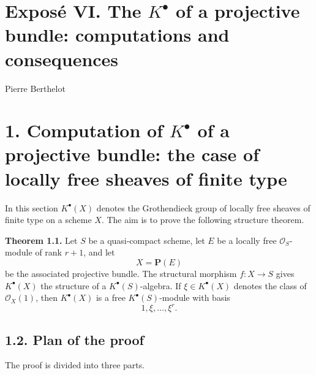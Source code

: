 \documentclass[11pt]{article}
\newcommand{\Spec}{\operatorname{Spec}}
\begin{document}
\providecommand{\Sym}{\operatorname{Sym}}
\providecommand{\Proj}{\operatorname{Proj}}
\providecommand{\Projz}{\operatorname{Proj}_0}
\providecommand{\Spec}{\operatorname{Spec}}
\providecommand{\Comp}{\operatorname{Comp}}
\providecommand{\Dplus}{D_{+}}
\providecommand{\id}{\operatorname{id}}
\providecommand{\cG}{\mathcal G}
\providecommand{\cA}{\mathcal A}
\providecommand{\cB}{\mathcal B}
\providecommand{\cL}{\mathscr L}
\providecommand{\cM}{\mathscr M}
\providecommand{\cN}{\mathscr N}
\providecommand{\cE}{\mathscr E}
\providecommand{\cK}{\mathscr K}
\providecommand{\cP}{\mathscr P}
\providecommand{\cQ}{\mathscr Q}
\providecommand{\OO}{\mathcal O}
\providecommand{\rk}{\operatorname{rk}}
\providecommand{\colim}{\operatorname*{colim}}


\section*{Exposé VI. The \(K^\bullet\) of a projective bundle: computations and consequences}
\begin{center}
Pierre Berthelot
\end{center}

\section*{1. Computation of \(K^\bullet\) of a projective bundle: the case of locally free sheaves of finite type}

In this section \(K^\bullet(X)\) denotes the Grothendieck group of locally free sheaves of finite type on a scheme \(X\). The aim is to prove the following structure theorem.

\textbf{Theorem 1.1.} Let \(S\) be a quasi-compact scheme, let \(E\) be a locally free \(\mathcal O_S\)-module of rank \(r+1\), and let
\[
  X=\mathbf P(E)
\]
be the associated projective bundle. The structural morphism \(f:X\to S\) gives \(K^\bullet(X)\) the structure of a \(K^\bullet(S)\)-algebra. If \(\xi\in K^\bullet(X)\) denotes the class of \(\mathcal O_X(1)\), then \(K^\bullet(X)\) is a free \(K^\bullet(S)\)-module with basis
\[
  1,\xi,\ldots,\xi^r .
\]

\subsection*{1.2. Plan of the proof}
The proof is divided into three parts.
\end{document}
